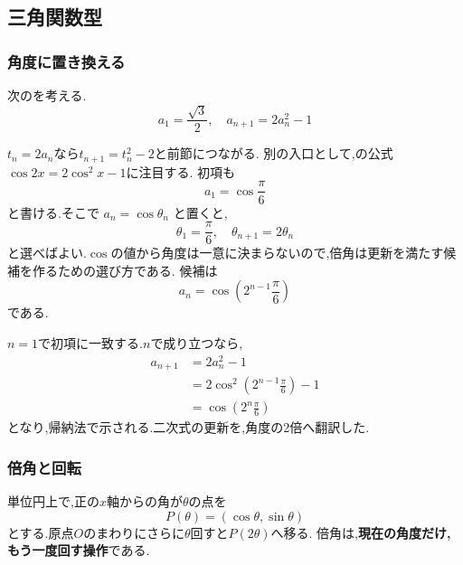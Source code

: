 \subsection{三角関数型}\label{節：三角関数型}
  \subsubsection{角度に置き換える}\label{節：解法}
    次のを考える.
    \[
      a_1=\frac{\sqrt{3}}{2},\quad a_{n+1}=2a_n^2-1
    \]

    $t_n=2a_n$なら$t_{n+1}=t_n^2-2$と前節につながる.
    別の入口として,の公式$\cos2x=2\cos^2x-1$に注目する.
    初項も
    \[
      a_1=\cos\frac{\pi}{6}
    \]
    と書ける.そこで $a_n=\cos\theta_n$ と置くと,
    \[
      \theta_1=\frac{\pi}{6},
      \quad
      \theta_{n+1}=2\theta_n
    \]
    と選べばよい.$\cos$の値から角度は一意に決まらないので,倍角は更新を満たす候補を作るための選び方である.
    候補は
    \[
      a_n=\cos\left(2^{n-1}\frac{\pi}{6}\right)
    \]
    である.

    $n=1$で初項に一致する.$n$で成り立つなら,
    \begin{align*}
      a_{n+1}
        &=2a_n^2-1\\
        &=2\cos^2\left(2^{n-1}\frac{\pi}{6}\right)-1\\
        &=\cos\left(2^n\frac{\pi}{6}\right)
    \end{align*}
    となり,帰納法で示される.二次式の更新を,角度の2倍へ翻訳した.

  \subsubsection{倍角と回転}\label{節：倍角を回転として見る}
    単位円上で,正の$x$軸からの角が$\theta$の点を
    \[
      P(\theta)=(\cos\theta,\sin\theta)
    \]
    とする.原点$O$のまわりにさらに$\theta$回すと$P(2\theta)$へ移る.
    倍角は,\textbf{現在の角度だけ,もう一度回す操作}である.

    \begin{center}
    \end{center}

